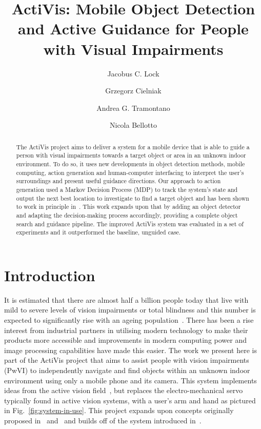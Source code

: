 \documentclass[runningheads]{llncs}
\begin{document}
\title{ActiVis: Mobile Object Detection and Active Guidance for People with Visual Impairments}

\author{Jacobus C. Lock \and
  Grzegorz Cielniak \and
  Andrea G. Tramontano \and
  Nicola Bellotto
}

\maketitle

\begin{abstract}
  The ActiVis project aims to deliver a system for a mobile device that is able to guide a person with visual impairments towards a target object or area in an unknown indoor environment. 
  To do so, it uses new developments in object detection methods, mobile computing, action generation and human-computer interfacing to interpret the user's surroundings and present useful guidance directions.
  Our approach to action generation used a Markov Decision Process (MDP) to track the system's state and output the next best location to investigate to find a target object and has been shown to work in principle in~\cite{lock2019active}.
  This work expands upon that by adding an object detector and adapting the decision-making process accordingly, providing a complete object search and guidance pipeline.
  The improved ActiVis system was evaluated in a set of experiments and it outperformed the baseline, unguided case.
\end{abstract}

\section{Introduction}

It is estimated that there are almost half a billion people today that live with mild to severe levels of vision impairments or total blindness and this number is expected to significantly rise with an ageing population~\cite{bourne2017magnitude}.
There has been a rise interest from industrial partners in utilising modern technology to make their products more accessible and improvements in modern computing power and image processing capabilities have made this easier.
The work we present here is part of the ActiVis project that aims to assist people with vision impairments (PwVI) to independently navigate and find objects within an unknown indoor environment using only a mobile phone and its camera.
This system implements ideas from the active vision field~\cite{bajcsy2017,bellotto2013}, but replaces the electro-mechanical servo typically found in active vision systems, with a user's arm and hand as pictured in Fig.~\ref{fig:system-in-use}.
This project expands upon concepts originally proposed in~\cite{bellotto2013} and~\cite{lock2017portable} and builds off of the system introduced in~\cite{lock2019active}.
\end{document}

